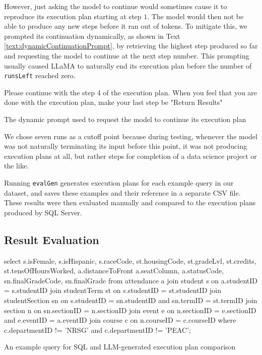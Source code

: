 However, just asking the model to continue would sometimes cause it to reproduce its execution plan starting at step $1$. The model would then not be able to produce any new steps before it ran out of tokens. To mitigate this, we prompted its continuation dynamically, as shown in Text \ref{text:dynamicContinuationPrompt}, by retrieving the highest step produced so far and requesting the model to continue at the next step number. This prompting usually caused LLaMA to naturally end its execution plan before the number of \lstinline{runsLeft} reached zero.

\begin{text}
  Please continue with the step 4 of the execution plan. When you feel that you are done with the execution plan, make your last step be "Return Results"
  \caption{The dynamic prompt used to request the model to continue its execution plan}
  \label{text:dynamicContinuationPrompt}
\end{text}

We chose seven runs as a cutoff point because during testing, whenever the model was not naturally terminating its input before this point, it was not producing execution plans at all, but rather steps for completion of a data science project or the like.

Running \lstinline{evalGen} generates execution plans for each example query in our dataset, and saves these examples and their reference in a separate CSV file. These results were then evaluated manually and compared to the execution plans produced by SQL Server.

\subsection{Result Evaluation}
\begin{text}
  \raggedright
  \ContinuedFloat*
  select s.isFemale, s.isHispanic, s.raceCode, st.housingCode, st.gradeLvl, st.credits, st.tensOfHoursWorked, a.distanceToFront a.seatColumn, a.statusCode, sn.finalGradeCode, sn.finalGrade from attendance a join student s on a.studentID = s.studentID join studentTerm st on s.studentID = st.studentID join studentSection sn on s.studentID = sn.studentID and sn.termID = st.termID join section n on sn.sectionID = n.sectionID join event e on n.sectionID = e.sectionID and e.eventID = a.eventID join course c on n.courseID = c.courseID where c.departmentID != 'NRSG' and c.departmentID != 'PEAC';
  \caption{An example query for SQL and LLM-generated execution plan comparison}
  \label{text:sqlVsLlamaPlan2}
\end{text}

